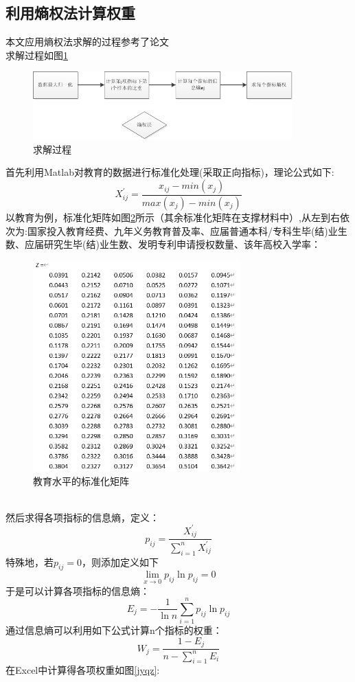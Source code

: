 \documentclass[UTF8]{article}
\begin{document}
	\subsection{利用熵权法计算权重}
	本文应用熵权法求解的过程参考了论文\cite{sqf}
	\\求解过程如图\ref{sqf}
	\newpage
	\begin{figure}[htb]
	\centering
	\includegraphics[width=10cm]{pictures/sqf.png}
	\caption{求解过程}
	\label{sqf}
	\end{figure}
	首先利用Matlab对教育的数据进行标准化处理(采取正向指标)，理论公式如下:
	$$
	X^{'}_{ij}=\frac{x_{ij}-min(x_j)}{max(x_j)-min(x_j)}
	$$
	以教育为例，标准化矩阵如图\ref{jybzhjz}所示（其余标准化矩阵在支撑材料中）,从左到右依次为:国家投入教育经费、九年义务教育普及率、应届普通本科/专科生毕(结)业生数、应届研究生毕(结)业生数、发明专利申请授权数量、该年高校入学率：
	\begin{figure}[htb]
	\centering
	\includegraphics[width=8cm]{pictures/jybzhjz.png}
	\caption{教育水平的标准化矩阵}
	\label{jybzhjz}
	\end{figure}
	\\然后求得各项指标的信息熵，定义：
	$$
	p_{ij}=\frac{X^{'}_{ij}}{\sum_{i=1}^{n}X^{'}_{ij}}
	$$
	特殊地，若$p_{ij}=0$，则添加定义如下
	$$
	\lim_{x\to 0}p_{ij}\ln p_{ij}=0
	$$
	于是可以计算各项指标的信息熵：
	$$
	E_j=-\frac{1}{\ln n}\sum_{i=1}^{n}p_{ij}\ln p_{ij}
	$$
	通过信息熵可以利用如下公式计算n个指标的权重：
	$$
	W_{j}=\frac{1-E_{j}}{n-\sum_{i=1}^{n}E_{i}}	
	$$
	在Excel中计算得各项权重如图\ref{jyqz}:
\end{document}
